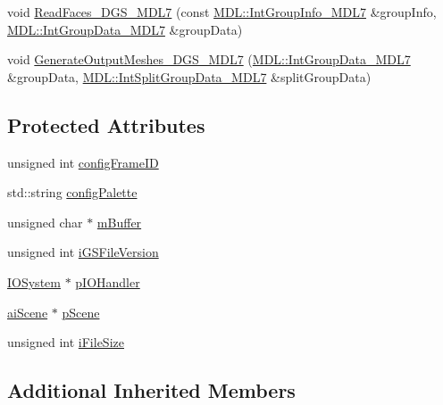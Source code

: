\begin{DoxyCompactItemize}
\item 
void \hyperlink{class_assimp_1_1_m_d_l_importer_afeb395ac8c41c973cd8497a675e46659}{Read\+Faces\+\_\+D\+G\+S\+\_\+\+M\+D\+L7} (const \hyperlink{struct_assimp_1_1_m_d_l_1_1_int_group_info___m_d_l7}{M\+D\+L\+::\+Int\+Group\+Info\+\_\+\+M\+D\+L7} \&group\+Info, \hyperlink{struct_assimp_1_1_m_d_l_1_1_int_group_data___m_d_l7}{M\+D\+L\+::\+Int\+Group\+Data\+\_\+\+M\+D\+L7} \&group\+Data)
\item 
void \hyperlink{class_assimp_1_1_m_d_l_importer_a4a46ef5aef4bb7e4bae395023f409aa9}{Generate\+Output\+Meshes\+\_\+D\+G\+S\+\_\+\+M\+D\+L7} (\hyperlink{struct_assimp_1_1_m_d_l_1_1_int_group_data___m_d_l7}{M\+D\+L\+::\+Int\+Group\+Data\+\_\+\+M\+D\+L7} \&group\+Data, \hyperlink{struct_assimp_1_1_m_d_l_1_1_int_split_group_data___m_d_l7}{M\+D\+L\+::\+Int\+Split\+Group\+Data\+\_\+\+M\+D\+L7} \&split\+Group\+Data)
\end{DoxyCompactItemize}
\subsection*{Protected Attributes}
\begin{DoxyCompactItemize}
\item 
unsigned int \hyperlink{class_assimp_1_1_m_d_l_importer_a4c132778226da8c47fa3bc964c2cca73}{config\+Frame\+I\+D}
\item 
std\+::string \hyperlink{class_assimp_1_1_m_d_l_importer_ab551f430fb4e07102424d27ae788fbf7}{config\+Palette}
\item 
unsigned char $\ast$ \hyperlink{class_assimp_1_1_m_d_l_importer_ac33a21b57e203a8d12fa632460191f21}{m\+Buffer}
\item 
unsigned int \hyperlink{class_assimp_1_1_m_d_l_importer_af4fd7e31090f7e9cebaf212af72ee801}{i\+G\+S\+File\+Version}
\item 
\hyperlink{class_assimp_1_1_i_o_system}{I\+O\+System} $\ast$ \hyperlink{class_assimp_1_1_m_d_l_importer_a5799905b6ba533b0f066684b859bc3d5}{p\+I\+O\+Handler}
\item 
\hyperlink{structai_scene}{ai\+Scene} $\ast$ \hyperlink{class_assimp_1_1_m_d_l_importer_a7c9f90a45d7a42bfc37d53bd8d7452e8}{p\+Scene}
\item 
unsigned int \hyperlink{class_assimp_1_1_m_d_l_importer_a1690abad19b3d5cab5e9880b2fdcfa94}{i\+File\+Size}
\end{DoxyCompactItemize}
\subsection*{Additional Inherited Members}


